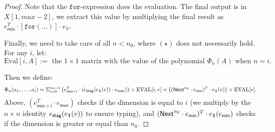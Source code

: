 \begin{proof}
    Note that the $ \texttt{for}$-expression does the evaluation. The final output is in $X[1,max-2]$, we extract this value by multiplying the final result as $e_{\mathsf{min}}^T\cdot [\texttt{for}(\ldots )]\cdot e_{V}$.

    Finally, we need to take care of all $n<n_0$, where $(\star)$ does not necessarily hold. For any $i$, let: $$\text{Eval}[i,A]:= \text{ the } 1\times 1 \text{ matrix with the value of the polynomial } \Phi_n(A) \text{ when } n=i.$$

    Then we define: 
    $$
    \Phi_n(a_1,\ldots, a_i)=\Sigma_{i=0}^{n_0-1}\left( e_{\mathsf{min}+\mathsf{i}}^T\cdot (e_{\mathsf{diag}}(e_{\mathbf{1}}(v))\cdot e_{\mathsf{max}}) \right) \times \text{EVAL}[i,v] + \left( (\mathsf{Next}^{n_0}\cdot e_{\mathsf{min}})^T\cdot e_{\mathbf{1}} (v) \right)\times \text{EVAL}[v].
    $$ 
    Above, $(e_{\mathsf{min}+\mathsf{i}}^T\cdot e_{\mathsf{max}})$ checks if the dimension is equal to $i$ (we multiply
    by the $n\times n$ identity $e_{\mathsf{diag}}(e_{\mathbf{1}}(v))$ to ensure typing), 
    and $(\mathsf{Next}^{n_0}\cdot e_{\mathsf{min}})^T\cdot e_{\mathbf{1}} (e_{\mathsf{min}})$ checks if the 
    dimension is greater or equal than $n_0$.

\end{proof}